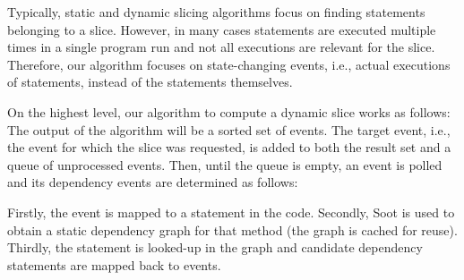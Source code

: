 %
%
%
%


Typically, static and dynamic slicing algorithms focus on finding statements belonging to a slice.
However, in many cases statements are executed multiple times in a single program run and not all executions are relevant for the slice.
Therefore, our algorithm focuses on state-changing events, i.e., actual executions of statements, instead of the statements themselves.

On the highest level, our algorithm to compute a dynamic slice works as follows:
The output of the algorithm will be a sorted set of events.
The target event, i.e., the event for which the slice was requested, is added to both the result set and a queue of unprocessed events.
Then, until the queue is empty, an event is polled and its dependency events are determined as follows:

Firstly, the event is mapped to a statement in the code.
Secondly, Soot is used to obtain a static dependency graph for that method (the graph is cached for reuse).
Thirdly, the statement is looked-up in the graph and candidate dependency statements are mapped back to events.

